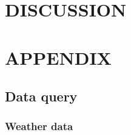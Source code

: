 \documentclass[12pt]{book}
\numberwithin{equation}{chapter}
\begin{document}
\hypertarget{discussion}{%
\chapter{DISCUSSION}\label{discussion}}

\singlespacing

\hypertarget{appendix}{%
\chapter*{APPENDIX}\label{appendix}}

\hypertarget{dataquery}{%
\section*{Data query}\label{dataquery}}

\hypertarget{weatherdat}{%
\subsection*{Weather data}\label{weatherdat}}
\end{document}
